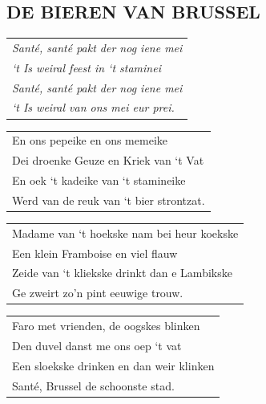 \documentclass{article}
\begin{document}
\subsection*{DE BIEREN VAN BRUSSEL}
\begin{flushleft}
\begin{tabularx}{0.8\textwidth} {
   >{\raggedright\arraybackslash}X}
   \textit{Santé, santé pakt der nog iene mei}\\
\textit{‘t Is weiral feest in ‘t staminei}\\
\textit{Santé, santé pakt der nog iene mei}\\
\textit{‘t Is weiral van ons mei eur prei.}\\
\end{tabularx}
\end{flushleft}\begin{flushleft}
\begin{tabularx}{0.8\textwidth} {
   >{\raggedright\arraybackslash}X}
   En ons pepeike en ons memeike\\
Dei droenke Geuze en Kriek van ‘t Vat\\
En oek ‘t kadeike van ‘t stamineike\\
Werd van de reuk van ‘t bier strontzat.\\
\end{tabularx}
\end{flushleft}\begin{flushleft}
\begin{tabularx}{0.8\textwidth} {
   >{\raggedright\arraybackslash}X}
   Madame van ‘t hoekske nam bei heur koekske\\
Een klein Framboise en viel flauw\\
Zeide van ‘t kliekske drinkt dan e Lambikske\\
Ge zweirt zo’n pint eeuwige trouw.\\
\end{tabularx}
\end{flushleft}\begin{flushleft}
\begin{tabularx}{0.8\textwidth} {
   >{\raggedright\arraybackslash}X}
Faro met vrienden, de oogskes blinken\\
Den duvel danst me ons oep ‘t vat\\
Een sloekske drinken en dan weir klinken\\
Santé, Brussel de schoonste stad.\\
\end{tabularx}
\end{flushleft}
\end{document}
